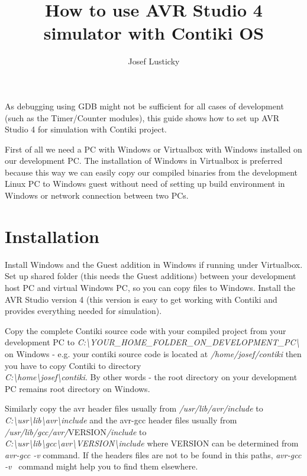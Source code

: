 \documentclass{article}
\begin{document}
\title{How to use AVR Studio 4 simulator with Contiki OS}
\author{Josef Lusticky}

\maketitle

As debugging using GDB might not be sufficient for all cases of development (such as the Timer/Counter modules),
this guide shows how to set up AVR Studio 4 for simulation with Contiki project.

First of all we need a PC with Windows or Virtualbox with Windows installed on our development PC.
The installation of Windows in Virtualbox is preferred because this way we can easily copy our compiled binaries
from the development Linux PC to Windows guest
without need of setting up build environment in Windows or network connection between two PCs.

\section{Installation}
Install Windows and the Guest addition in Windows if running under Virtualbox.
Set up shared folder (this needs the Guest additions) between your development host PC and virtual Windows PC, so you can copy files to Windows.
Install the AVR Studio version 4 (this version is easy to get working with Contiki and provides everything needed for simulation).

Copy the complete Contiki source code with your compiled project from your development PC to
{\it{C:\textbackslash YOUR\_HOME\_FOLDER\_ON\_DEVELOPMENT\_PC\textbackslash}}
on Windows - e.g. your contiki source code is located at {\it{/home/josef/contiki}}
then you have to copy Contiki to directory \\
{\it{C:\textbackslash home\textbackslash josef\textbackslash contiki}}.
By other words - the root directory on your development PC remains root directory on Windows.

Similarly copy the avr header files usually from {\it{/usr/lib/avr/include}} to
{\it{C:\textbackslash usr\textbackslash lib\textbackslash avr\textbackslash include}}
and the avr-gcc header files usually from {\it{/usr/lib/gcc/avr/}}VERSION{\it{/include}} to \\
{\it{C:\textbackslash usr\textbackslash lib\textbackslash gcc\textbackslash avr\textbackslash VERSION\textbackslash include}}
where VERSION can be determined from {\it{avr-gcc -v}} command.
If the headers files are not to be found in this paths, {\it{avr-gcc -v }} command might help you to find them elsewhere.
\end{document}
